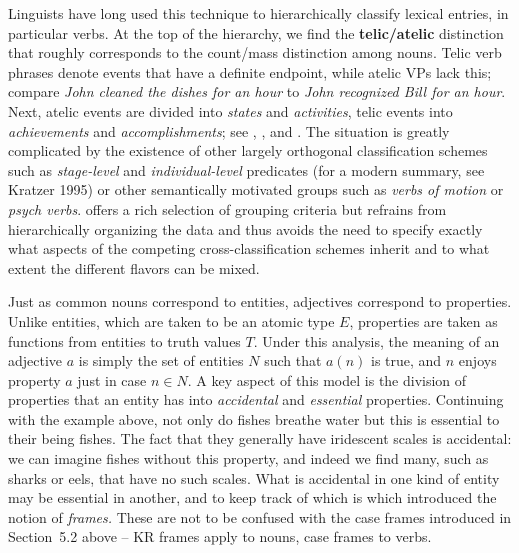 Linguists have long used this technique to hierarchically classify lexical
entries, in particular verbs. At the top of the hierarchy, we find the {\bf
  telic/atelic} distinction that roughly corresponds to the count/mass
distinction among nouns. Telic verb phrases denote events that have a definite
endpoint, while atelic VPs lack this; compare {\it John cleaned the dishes for
  an hour} to {\it *John recognized Bill for an hour}.  Next, atelic events
are divided into {\it states} and {\it activities}, telic events into {\it
  achievements} and {\it accomplishments}; see ,
, and .  
  The situation is greatly complicated by the
existence of other largely orthogonal classification schemes such as {\it
  stage-level} and {\it individual-level} predicates\nocite{Kratzer:1995} (for
a modern summary, see Kratzer 1995) or other semantically motivated groups
such as {\it verbs of motion} or {\it psych verbs}.  
offers a rich selection of grouping criteria but refrains from hierarchically
organizing the data and thus avoids the need to specify exactly what aspects
of the competing cross-classification schemes inherit and to what extent the
different flavors can be mixed.

Just as common nouns correspond to entities, adjectives correspond to
properties.  Unlike entities, which are taken to be an atomic type $E$,
properties are taken as functions from entities to truth values
$T$. Under this analysis, the meaning of an adjective $a$
is simply the set of entities $N$ such that $a(n)$ is true, and $n$ enjoys
property $a$ just in case $n \in N$.  A key aspect of this model is the
division of properties that an entity has into {\it accidental} and {\it
  essential} properties. Continuing with the example above, not only do fishes
breathe water but this is essential to their being fishes. The fact that they
generally have iridescent scales is accidental: we can imagine fishes without
this property, and indeed we find many, such as sharks or eels, that have no
such scales.  What is accidental in one kind of entity may be essential in
another, and to keep track of which is which  introduced
the notion of {\it frames.} These are not to be confused with the case frames
introduced in Section~5.2 above -- KR frames apply to nouns, case frames to
verbs.

